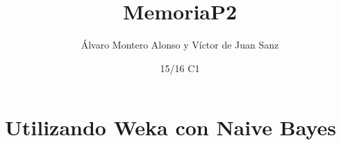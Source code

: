 \documentclass{apuntes}
\title{MemoriaP2}
\author{Álvaro Montero Alonso y Víctor de Juan Sanz}
\date{15/16 C1}
\begin{document}
\pagestyle{plain}
\maketitle

\tableofcontents
\newpage
\section{Utilizando Weka con Naive Bayes}
\end{document}
